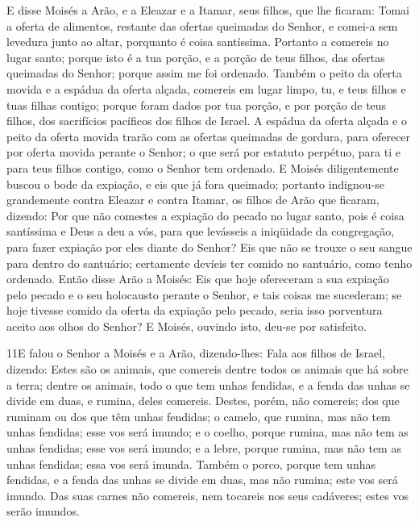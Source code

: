 E disse Moisés a Arão, e a Eleazar e a Itamar, seus filhos, que
lhe ficaram: Tomai a oferta de alimentos, restante das ofertas
queimadas do Senhor, e comei-a sem levedura junto ao altar,
porquanto é coisa santíssima. Portanto a comereis no lugar
santo; porque isto é a tua porção, e a porção de teus filhos, das
ofertas queimadas do Senhor; porque assim me foi ordenado.
Também o peito da oferta movida e a espádua da oferta alçada,
comereis em lugar limpo, tu, e teus filhos e tuas filhas contigo;
porque foram dados por tua porção, e por porção de teus filhos, dos
sacrifícios pacíficos dos filhos de Israel. A espádua da
oferta alçada e o peito da oferta movida trarão com as ofertas
queimadas de gordura, para oferecer por oferta movida perante o
Senhor; o que será por estatuto perpétuo, para ti e para teus filhos
contigo, como o Senhor tem ordenado. E Moisés diligentemente
buscou o bode da expiação, e eis que já fora queimado; portanto
indignou-se grandemente contra Eleazar e contra Itamar, os filhos de
Arão que ficaram, dizendo: Por que não comestes a expiação do
pecado no lugar santo, pois é coisa santíssima e Deus a deu a vós,
para que levásseis a iniqüidade da congregação, para fazer expiação
por eles diante do Senhor? Eis que não se trouxe o seu sangue
para dentro do santuário; certamente devíeis ter comido no
santuário, como tenho ordenado. Então disse Arão a Moisés:
Eis que hoje ofereceram a sua expiação pelo pecado e o seu
holocausto perante o Senhor, e tais coisas me sucederam; se hoje
tivesse comido da oferta da expiação pelo pecado, seria isso
porventura aceito aos olhos do Senhor? E Moisés, ouvindo
isto, deu-se por satisfeito.

\medskip

\lettrine{11} E falou o Senhor a Moisés e a Arão,
dizendo-lhes: Fala aos filhos de Israel, dizendo: Estes são os
animais, que comereis dentre todos os animais que há sobre a terra;
dentre os animais, todo o que tem unhas fendidas, e a fenda das
unhas se divide em duas, e rumina, deles comereis. Destes,
porém, não comereis; dos que ruminam ou dos que têm unhas fendidas;
o camelo, que rumina, mas não tem unhas fendidas; esse vos será
imundo; e o coelho, porque rumina, mas não tem as unhas
fendidas; esse vos será imundo; e a lebre, porque rumina, mas
não tem as unhas fendidas; essa vos será imunda. Também o porco,
porque tem unhas fendidas, e a fenda das unhas se divide em duas,
mas não rumina; este vos será imundo. Das suas carnes não
comereis, nem tocareis nos seus cadáveres; estes vos serão imundos.

